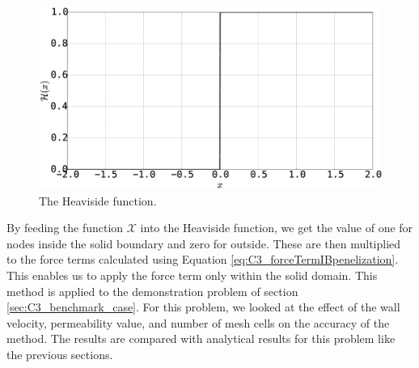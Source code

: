 \begin{figure}[h]
	\centering
	\includegraphics[width=14.cm]{Chapter_3/figure/Heaviside_Function.eps}
	\caption{The Heaviside function.}
	\label{{fig:C3_heavisideFunction}}
\end{figure}

By feeding the function $\mathcal{X}$ into the Heaviside function, we get the value of one for nodes inside the solid boundary and zero for outside. These are then multiplied to the force terms calculated using Equation \eqref{eq:C3_forceTermIBpenelization}. This enables us to apply the force term only within the solid domain. This method is applied to the demonstration problem of section \ref{sec:C3_benchmark_case}. For this problem, we looked at the effect of the wall velocity, permeability value, and number of mesh cells on the accuracy of the method. The results are compared with analytical results for this problem like the previous sections.

